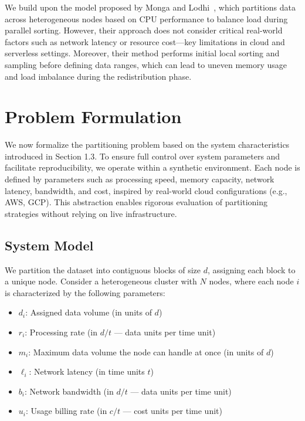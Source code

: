 \documentclass[]{interact}
\theoremstyle{plain}
\theoremstyle{definition}
\theoremstyle{remark}
\begin{document}
We build upon the model proposed by Monga and Lodhi~\cite{monga2020heterogeneous}, which partitions data across heterogeneous nodes based on CPU performance to balance load during parallel sorting. However, their approach does not consider critical real-world factors such as network latency or resource cost—key limitations in cloud and serverless settings. Moreover, their method performs initial local sorting and sampling before defining data ranges, which can lead to uneven memory usage and load imbalance during the redistribution phase.





\section{Problem Formulation}

We now formalize the partitioning problem based on the system characteristics introduced in Section 1.3. To ensure full control over system parameters and facilitate reproducibility, we operate within a synthetic environment. Each node is defined by parameters such as processing speed, memory capacity, network latency, bandwidth, and cost, inspired by real-world cloud configurations (e.g., AWS, GCP). This abstraction enables rigorous evaluation of partitioning strategies without relying on live infrastructure.

\subsection{System Model}

We partition the dataset into contiguous blocks of size $d$, assigning each block to a unique node. Consider a heterogeneous cluster with $N$ nodes, where each node $i$ is characterized by the following parameters:

\begin{itemize}
    \item $d_i$: Assigned data volume (in units of $d$)
    \item $r_i$: Processing rate (in $d/t$ — data units per time unit)
    \item $m_i$: Maximum data volume the node can handle at once (in units of $d$)
    \item $\ell_i$: Network latency (in time units $t$)
    \item $b_i$: Network bandwidth (in $d/t$ — data units per time unit)
    \item $u_i$: Usage billing rate (in $c/t$ — cost units per time unit)
\end{itemize}
\end{document}
